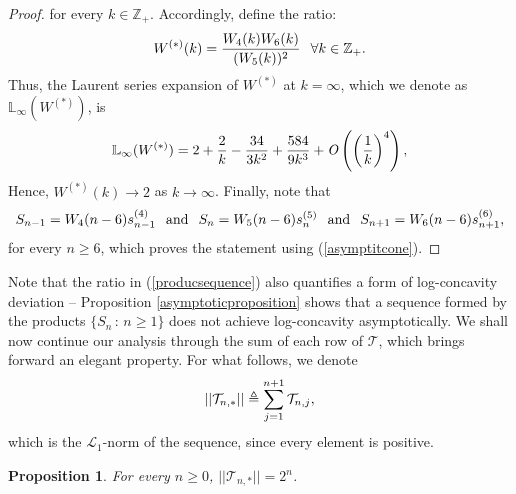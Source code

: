 \documentclass[a4paper,12pt]{article}
\newtheorem{prop}[thm]{Proposition}
\def\Z{\mathbb{Z}}
\def\T{\mathcal{T}}
\begin{document}
\begin{proof}
for every $k\in\Z_+$. Accordingly, define the ratio:
\begin{align}
W^{(*)}(k) = \frac{W_4(k)W_6(k)}{(W_5(k))^2} \hspace{0.1in} \forall k\in\Z_+.
\end{align}
Thus, the Laurent series expansion of $W^{(*)}$ at $k=\infty$, which we denote as $\mathbb{L}_{\infty}(W^{(*)})$, is
\begin{align}
\mathbb{L}_{\infty}(W^{(*)}) = 2 + \frac{2}{k} - \frac{34}{3k^2} + \frac{584}{9k^3} + \text{\emph{O}}\left( \left(\frac{1}{k}\right)^4 \right), \notag
\end{align}
Hence, $W^{(*)}(k) \rightarrow 2$ as $k\rightarrow \infty$. Finally, note that
\begin{align}
S_{n-1} = W_4(n-6)s^{(4)}_{n-1} \hspace{0.1in} \text{and} \hspace{0.1in} S_{n} = W_5(n-6)s^{(5)}_{n} \hspace{0.1in} \text{and} \hspace{0.1in} S_{n+1} = W_6(n-6)s^{(6)}_{n+1}, \notag
\end{align}
for every $n\geq 6$, which proves the statement using (\ref{asymptitcone}).
\end{proof}
Note that the ratio in (\ref{producsequence}) also quantifies a form of log-concavity deviation -- Proposition \ref{asymptoticproposition} shows that a sequence formed by the products $\{S_n \, : \, n\geq 1\}$ does not achieve log-concavity asymptotically. We shall now continue our analysis through the sum of each row of $\T$, which brings forward an elegant property. For what follows, we denote
\begin{align}
||\T_{n,*}|| \triangleq \sum_{j=1}^{n+1} \T_{n,j}, \notag
\end{align}
which is the $\mathcal{L}_1$-norm of the sequence, since every element is positive.
\begin{prop}
\label{summationpowertwo}
For every $n\geq 0$, $||\T_{n,*}|| = 2^{n}$.
\end{prop}
\end{document}
